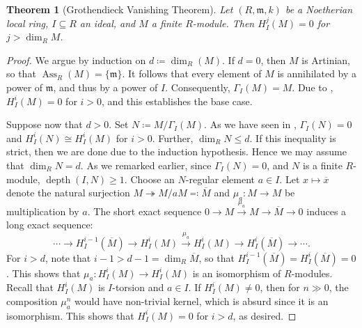 \documentclass[10pt]{article}
\theoremstyle{thmstyle}
\newtheorem{theorem}{Theorem}[section]
\theoremstyle{defstyle}
\newcommand{\frakm}{\mathfrak{m}} %
\newcommand{\onto}{\twoheadrightarrow}
\renewcommand{\le}{\leqslant}
\renewcommand{\ge}{\geqslant}
\newcommand{\Ass}{\operatorname{Ass}}
\newcommand{\depth}{\operatorname{depth}}
\begin{document}
\begin{theorem}[Grothendieck Vanishing Theorem]
	Let $(R,\frakm,k)$ be a Noetherian local ring, $I\subseteq R$ an ideal, and $M$ a finite $R$-module. Then $H^j_I(M) = 0$ for $j > \dim_R M$.
\end{theorem}
\begin{proof}
	We argue by induction on $d\coloneq\dim_R(M)$. If $d = 0$, then $M$ is Artinian, so that $\Ass_R(M) = \{\frakm\}$. It follows that every element of $M$ is annihilated by a power of $\frakm$, and thus by a power of $I$. Consequently, $\Gamma_I(M) = M$. Due to , $H^i_I(M) = 0$ for $i > 0$, and this establishes the base case.

	Suppose now that $d > 0$. Set $N\coloneq M/\Gamma_I(M)$. As we have seen in , $\Gamma_I(N) = 0$ and $H^i_I(N)\cong H^i_I(M)$ for $i > 0$. Further, $\dim_R N\le d$. If this inequality is strict, then we are done due to the induction hypothesis. Hence we may assume that $\dim_R N = d$. As we remarked earlier, since $\Gamma_I(N) = 0$, and $N$ is a finite $R$-module, $\depth(I, N)\ge 1$. Choose an $N$-regular element $a\in I$. Let $x\mapsto\overline x$ denote the natural surjection $M\onto M/aM\eqcolon\overline M$ and $\mu_a: M\to M$ be multiplication by $a$. The short exact sequence $0\to M\xrightarrow{\mu_a} M\to\overline M\to 0$ induces a long exact sequence: 
	\begin{equation*}
		\cdots\to H^{i - 1}_I(\overline M)\to H^i_I(M)\xrightarrow{\mu_a} H^i_I(M)\to H^i_I(\overline M)\to\cdots.
	\end{equation*}
	For $i > d$, note that $i - 1 > d - 1 = \dim_R\overline M$, so that $H^{i - 1}_I(\overline M) = H^i_I(\overline M) = 0$. This shows that $\mu_a: H^i_I(M)\to H^i_I(M)$ is an isomorphism of $R$-modules. Recall that $H^i_I(M)$ is $I$-torsion and $a\in I$. If $H^i_I(M)\ne 0$, then for $n\gg 0$, the composition $\mu_a^n$ would have non-trivial kernel, which is absurd since it is an isomorphism. This shows that $H^i_I(M) = 0$ for $i > d$, as desired.
\end{proof}
\end{document}
